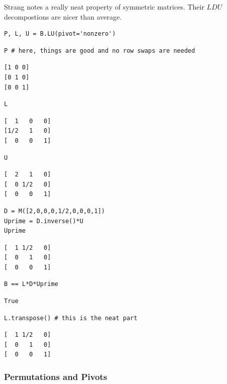 \documentclass[10pt,]{book}
\theoremstyle{plain}
\numberwithin{equation}{section}
\begin{document}
        Strang notes a really neat property of symmetric matrices. Their
        \(LDU\) decompostions are nicer than average.
\begin{lstlisting}[style=sageinput]
P, L, U = B.LU(pivot='nonzero')
\end{lstlisting}
\begin{lstlisting}[style=sageinput]
P # here, things are good and no row swaps are needed
\end{lstlisting}
\begin{lstlisting}[style=sageoutput]
[1 0 0]
[0 1 0]
[0 0 1]
\end{lstlisting}
\begin{lstlisting}[style=sageinput]
L
\end{lstlisting}
\begin{lstlisting}[style=sageoutput]
[  1   0   0]
[1/2   1   0]
[  0   0   1]
\end{lstlisting}
\begin{lstlisting}[style=sageinput]
U
\end{lstlisting}
\begin{lstlisting}[style=sageoutput]
[  2   1   0]
[  0 1/2   0]
[  0   0   1]
\end{lstlisting}
\begin{lstlisting}[style=sageinput]
D = M([2,0,0,0,1/2,0,0,0,1])
Uprime = D.inverse()*U
Uprime
\end{lstlisting}
\begin{lstlisting}[style=sageoutput]
[  1 1/2   0]
[  0   1   0]
[  0   0   1]
\end{lstlisting}
\begin{lstlisting}[style=sageinput]
B == L*D*Uprime
\end{lstlisting}
\begin{lstlisting}[style=sageoutput]
True
\end{lstlisting}
\begin{lstlisting}[style=sageinput]
L.transpose() # this is the neat part
\end{lstlisting}
\begin{lstlisting}[style=sageoutput]
[  1 1/2   0]
[  0   1   0]
[  0   0   1]
\end{lstlisting}
\typeout{************************************************}
\typeout{************************************************}
\subsubsection[Permutations and Pivots]{Permutations and Pivots}\label{subsubsection-35}
\end{document}
